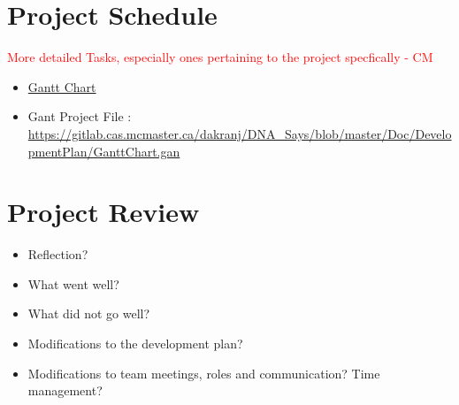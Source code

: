 \documentclass{article}
\begin{document}
\section{Project Schedule}
\textcolor{red}{More detailed Tasks, especially ones pertaining to the project specfically - CM} \\
\begin{itemize}
\item \href{run:GanttChart.gan} {Gantt Chart}\\
\item Gant Project File :
\url{https://gitlab.cas.mcmaster.ca/dakranj/DNA_Says/blob/master/Doc/DevelopmentPlan/GanttChart.gan}
\end{itemize}
\section{Project Review}
\begin{itemize}
\item Reflection?
\item What went well?
\item  What did not go well?
\item Modifications to the development plan?
\item Modifications to team meetings, roles and communication? Time management?
\end{itemize}
\end{document}
